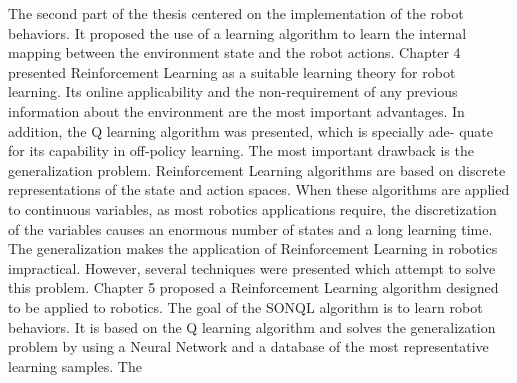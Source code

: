 The second part of the thesis centered on the implementation of the robot
behaviors. It proposed the use of a learning algorithm to learn the internal mapping between the environment state and the robot actions. Chapter 4 presented Reinforcement Learning as a suitable learning theory for robot learning. Its online applicability and the non-requirement of any previous information about the environment are the most important advantages. In addition, the Q learning algorithm was presented, which is specially ade- quate for its capability in off-policy learning. The most important drawback is the generalization problem. Reinforcement Learning algorithms are based on discrete representations of the state and action spaces. When these algorithms are applied to continuous variables, as most robotics applications require, the discretization of the variables causes an enormous number of states and a long learning time. The generalization makes the application of Reinforcement Learning in robotics impractical. However, several techniques were presented which attempt to solve this problem. Chapter 5 proposed a Reinforcement Learning algorithm designed to be applied to robotics. The goal of the SONQL algorithm is to learn robot behaviors. It is based on the Q learning algorithm and solves the generalization problem by using a Neural Network and a database of the most representative learning samples.
The




